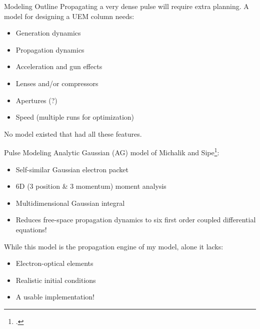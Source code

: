 \begin{frame}{Modeling Outline}
Propagating a very dense pulse will require extra planning. A model for designing a UEM column needs:
	\begin{itemize}[<+->]
	    \item Generation dynamics
		\item Propagation dynamics
		\item Acceleration and gun effects
		\item Lenses and/or compressors	
		\item Apertures (?)
		\item Speed (multiple runs for optimization)
	\end{itemize}
No model existed that had all these features.
\end{frame}

\begin{frame}{Pulse Modeling}
	Analytic Gaussian (AG) model of Michalik and Sipe\footcite{michalik_analytic_2006}: 
	\begin{itemize}
		\item<2-> Self-similar Gaussian electron packet
		\item<3-> 6D (3 position \& 3 momentum) moment analysis
		\item<4-> Multidimensional Gaussian integral
		\item<5->[$\Rightarrow$] Reduces free-space propagation dynamics to six first order coupled differential equations!
	\end{itemize}
    While this model is the propagation engine of my model, alone it lacks:
    \begin{itemize}
      \item<6-> Electron-optical elements
      \item<7-> Realistic initial conditions
      \item<8-> A usable implementation!
    \end{itemize}
\end{frame}

